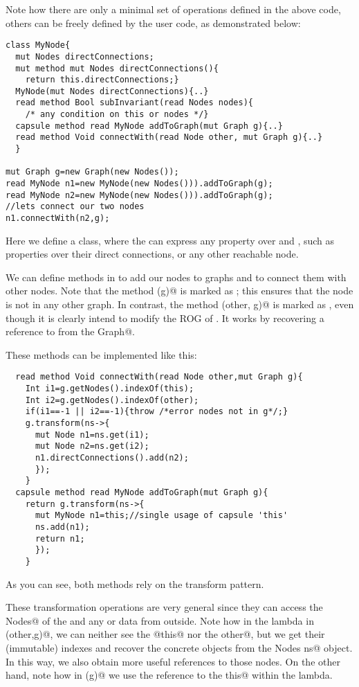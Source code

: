 Note how there are only a minimal set of operations defined in the above code, %
others can be freely defined by the user code, as demonstrated below:

\begin{lstlisting}
class MyNode{
  mut Nodes directConnections;
  mut method mut Nodes directConnections(){
    return this.directConnections;}
  MyNode(mut Nodes directConnections){..}
  read method Bool subInvariant(read Nodes nodes){
    /* any condition on this or nodes */}  
  capsule method read MyNode addToGraph(mut Graph g){..}
  read method Void connectWith(read Node other, mut Graph g){..}
  }

mut Graph g=new Graph(new Nodes());
read MyNode n1=new MyNode(new Nodes())).addToGraph(g);
read MyNode n2=new MyNode(new Nodes())).addToGraph(g);
//lets connect our two nodes
n1.connectWith(n2,g);
\end{lstlisting}
Here we define a \Q@MyNode@ class, where the \Q@subInvariant@ can express any property over \Q@this@ and \Q@nodes@, such as properties over their direct connections, or any other reachable node.

We can define methods in \Q@MyNode@ to add our nodes
to graphs and to connect them with other nodes.
Note that the method \Q@addToGraph(g)@ is marked as \Q@capsule@; this ensures that the node is not in any other graph.
In contrast, the method \Q@connectWith(other, g)@ is marked as \Q@read@, even though it is clearly intend to modify the ROG of \Q@this@.
It works by recovering a \Q@mut@ reference to \Q@this@ from the \Q@mut Graph@.

These methods can be implemented like this:
\begin{lstlisting}
  read method Void connectWith(read Node other,mut Graph g){
    Int i1=g.getNodes().indexOf(this);
    Int i2=g.getNodes().indexOf(other);
    if(i1==-1 || i2==-1){throw /*error nodes not in g*/;}
    g.transform(ns->{
      mut Node n1=ns.get(i1);
      mut Node n2=ns.get(i2);
      n1.directConnections().add(n2);
      });
    }
  capsule method read MyNode addToGraph(mut Graph g){
    return g.transform(ns->{
      mut MyNode n1=this;//single usage of capsule 'this'
      ns.add(n1);
      return n1;
      });
    }
\end{lstlisting}
As you can see, both methods rely on the transform pattern.

These transformation operations are very general since they
can access the \Q@mut Nodes@ of the \Q@Graph@ and 
any \Q@capsule@ or \Q@imm@ data from outside.
Note how in the lambda in \Q@connectWith(other,g)@, we can neither see the \Q@read@ @this@ nor the \Q@read other@, but we get their (immutable) indexes 
and recover the concrete objects from the \Q@mut Nodes ns@ object.
In this way, we also obtain more useful \Q@mut@ references to those nodes.
On the other hand, note how in \Q@addToGraph(g)@ we use the reference to the \Q@capsule this@ within the lambda.

